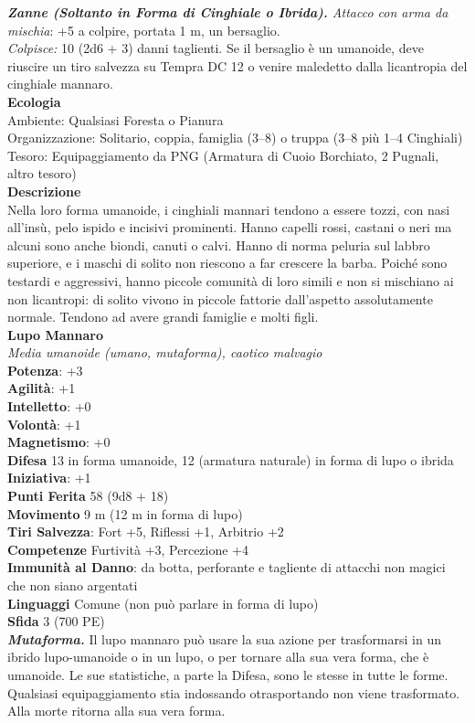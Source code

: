 \begin{multicols}{2}
\emph{\textbf{Zanne (Soltanto in Forma di Cinghiale o Ibrida).} Attacco con arma da mischia}: +5 a colpire, portata 1 m, un bersaglio.\\
\emph{Colpisce:} 10 (2d6 + 3) danni taglienti. Se il bersaglio è un umanoide, deve riuscire un tiro salvezza su Tempra DC 12 o venire maledetto dalla licantropia del cinghiale mannaro.\\
\textbf{Ecologia}\\
Ambiente: Qualsiasi Foresta o Pianura\\
Organizzazione: Solitario, coppia, famiglia (3–8) o truppa (3–8 più 1–4 Cinghiali)\\
Tesoro: Equipaggiamento da PNG (Armatura di Cuoio Borchiato, 2 Pugnali, altro tesoro)\\
\textbf{Descrizione}\\
Nella loro forma umanoide, i cinghiali mannari tendono a essere tozzi, con nasi all'insù, pelo ispido e incisivi prominenti. Hanno capelli rossi, castani o neri ma alcuni sono anche biondi, canuti o calvi. Hanno di norma peluria sul labbro superiore, e i maschi di solito non riescono a far crescere la barba. Poiché sono testardi e aggressivi, hanno piccole comunità di loro simili e non si mischiano ai non licantropi: di solito vivono in piccole fattorie dall’aspetto assolutamente normale. Tendono ad avere grandi famiglie e molti figli.\\

\medskip\textbf{Lupo Mannaro}\\
\emph{Media umanoide (umano, mutaforma), caotico malvagio}\\
\textbf{Potenza}: +3\\
\textbf{Agilità}: +1\\
\textbf{Intelletto}: +0\\
\textbf{Volontà}: +1\\
\textbf{Magnetismo}: +0\\
\textbf{Difesa} 13 in forma umanoide, 12 (armatura naturale) in forma di lupo o ibrida \\ \textbf{Iniziativa}: +1\\
\textbf{Punti Ferita} 58 (9d8 + 18)\\
\textbf{Movimento} 9 m (12 m in forma di lupo)\\
\textbf{Tiri Salvezza}: Fort +5, Riflessi +1, Arbitrio +2\\
\textbf{Competenze} Furtività +3, Percezione +4\\
\textbf{Immunità al Danno}: da botta, perforante e tagliente di attacchi non magici che non siano argentati\\
\textbf{Linguaggi} Comune (non può parlare in forma di lupo)\\
\textbf{Sfida} 3 (700 PE)\smallskip\\
\emph{\textbf{Mutaforma.}} Il lupo mannaro può usare la sua azione per trasformarsi in un ibrido lupo-umanoide o in un lupo, o per tornare alla sua vera forma, che è umanoide. Le sue statistiche, a parte la Difesa, sono le stesse in tutte le forme. Qualsiasi equipaggiamento stia indossando otrasportando non viene trasformato. Alla morte ritorna alla sua vera  forma.\\


\end{multicols}
